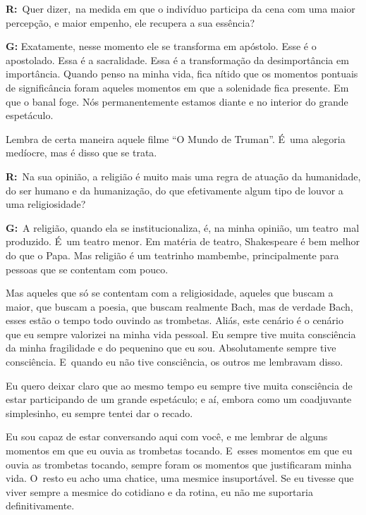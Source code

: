  

\textbf{R:}~Quer dizer,\textbf{}~na medida em que o indivíduo participa
da cena com uma maior percepção, e maior empenho, ele recupera a sua
essência?

 

\textbf{G:} Exatamente, nesse momento ele se transforma em apóstolo.
Esse é o apostolado. Essa é a sacralidade. Essa é a transformação da
desimportância em importância. Quando penso na minha vida, fica nítido
que os momentos pontuais de significância foram aqueles momentos em que
a solenidade fica presente. Em que o banal foge. Nós permanentemente
estamos diante e no interior do grande espetáculo.

 

Lembra de certa maneira aquele filme ``O Mundo de Truman''. É~uma
alegoria medíocre, mas é disso que se trata.

 

\textbf{R:}~Na sua opinião, a religião é muito mais uma regra de atuação
da humanidade, do ser humano e da humanização, do que efetivamente algum
tipo de louvor a uma religiosidade?

 

\textbf{G:}~A religião, quando ela se institucionaliza, é, na minha
opinião, um teatro\textbf{}~mal produzido. É~um teatro menor. Em matéria
de teatro, Shakespeare é bem melhor do que o Papa. Mas religião é um
teatrinho mambembe, principalmente para pessoas que se contentam com
pouco.

 

Mas aqueles que só se contentam com a religiosidade, aqueles que buscam
a maior, que buscam a poesia, que buscam realmente Bach, mas de verdade
Bach, esses estão o tempo todo ouvindo as trombetas. Aliás, este cenário
é o cenário que eu sempre valorizei na minha vida pessoal. Eu sempre
tive muita consciência da minha fragilidade e do pequenino que eu sou.
Absolutamente sempre tive consciência. E~quando eu não tive consciência,
os outros me lembravam disso.

 

Eu quero deixar claro que ao mesmo tempo eu sempre tive muita
consciência de estar participando de um grande espetáculo; e aí, embora
como um coadjuvante simplesinho, eu sempre tentei dar o recado.

 

Eu sou capaz de estar conversando aqui com você, e me lembrar de alguns
momentos em que eu ouvia as trombetas tocando. E~esses momentos em que
eu ouvia as trombetas tocando, sempre foram os momentos que justificaram
minha vida. O~resto eu acho uma chatice, uma mesmice insuportável. Se eu
tivesse que viver sempre a mesmice do cotidiano e da rotina, eu não me
suportaria definitivamente.

